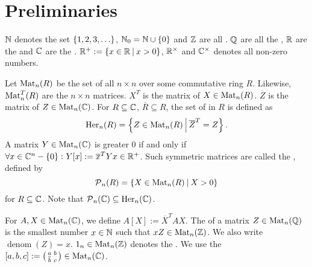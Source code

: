 

\section{Preliminaries}

$\mathbb{N}$ denotes the set $\Set{1,2,3,\dots}$, $\N_0 = \N \cup \Set{0}$ and $\mathbb{Z}$ are all . $\mathbb{Q}$ are all the , $\mathbb{R}$ are the  and $\mathbb{C}$ are the . $\R^+ := \Set{x\in\R}{x>0}$, $\mathbb{R}^\times$ and $\mathbb{C}^\times$ denotes all non-zero numbers.

Let $\operatorname{Mat}_n(R)$ be the set of all $n \times n$  over some commutative ring $R$.
Likewise, $\operatorname{Mat}_n^T(R)$ are the  $n \times n$ matrices.
$X^T$ is the  matrix of $X \in \operatorname{Mat}_n(R)$.
$\overline{Z}$ is the  matrix of $Z \in \operatorname{Mat}_n(\mathbb{C})$.
For $R \subseteq \mathbb{C}$, $\overline{R} \subseteq R$, the set of  in $R$ is defined as
\[ \Her_n(R) = \Set{Z \in \M_n(R)}{\overline{Z}^T = Z} . \]
A matrix $Y \in \operatorname{Mat}_n(\mathbb{C})$ is greater $0$ if and only if $\forall x \in \C^n - \Set{0} \colon Y[x] := \overline{x}^{T} Y x \in \R^+$.
Such symmetric matrices are called the , defined by
\[ \PM_n(R) = \Set{X \in \M_n(R)}{X > 0} \]
for $R \subseteq \mathbb{C}$. Note that $\operatorname{\mathcal{P}}_n(\mathbb{C}) \subseteq \operatorname{Her}_n(\mathbb{C})$.

For $A,X \in \operatorname{Mat}_n(\mathbb{C})$, we define $A[X] := \overline{X}^T A X$. 
The  of a matrix $Z \in \operatorname{Mat}_n(\mathbb{Q})$ is the smallest number $x \in \mathbb{N}$ such that $x Z \in \operatorname{Mat}_n(\mathbb{Z})$. We also write $\operatorname{denom}(Z) = x$. $1_n \in \operatorname{Mat}_n(\mathbb{Z})$ denotes the . We use the  $[a,b,c] := \left( \begin{smallmatrix} a & b \\ \overline b & c \end{smallmatrix} \right) \in \operatorname{Mat}_n(\mathbb{C})$.

